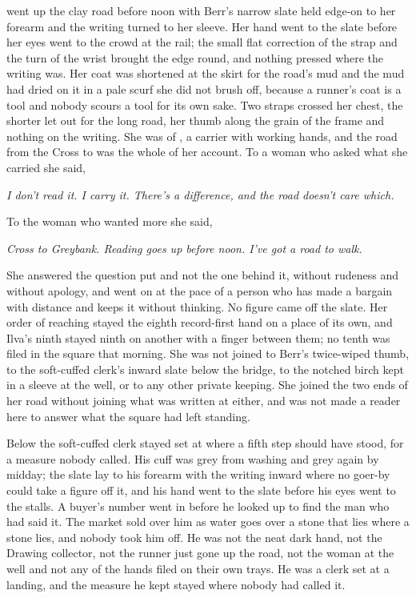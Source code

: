 \scenebreak

 went up the clay road before noon with Berr's narrow slate held edge-on to her forearm and the writing turned to her sleeve. Her hand went to the slate before her eyes went to the crowd at the rail; the small flat correction of the strap and the turn of the wrist brought the edge round, and nothing pressed where the writing was. Her coat was shortened at the skirt for the road's mud and the mud had dried on it in a pale scurf she did not brush off, because a runner's coat is a tool and nobody scours a tool for its own sake. Two straps crossed her chest, the shorter let out for the long road, her thumb along the grain of the frame and nothing on the writing. She was of , a carrier with working hands, and the road from the Cross to  was the whole of her account. To a woman who asked what she carried she said,

\emph{I don't read it. I carry it. There's a difference, and the road doesn't care which.}

To the woman who wanted more she said,

\emph{Cross to Greybank. Reading goes up before noon. I've got a road to walk.}

She answered the question put and not the one behind it, without rudeness and without apology, and went on at the pace of a person who has made a bargain with distance and keeps it without thinking. No figure came off the slate. Her order of reaching stayed the eighth record-first hand on a place of its own, and Ilva's ninth stayed ninth on another with a finger between them; no tenth was filed in the square that morning. She was not joined to Berr's twice-wiped thumb, to the soft-cuffed clerk's inward slate below the bridge, to the notched birch kept in a sleeve at the well, or to any other private keeping. She joined the two ends of her road without joining what was written at either, and was not made a reader here to answer what the square had left standing.

Below  the soft-cuffed clerk stayed set at  where a fifth step should have stood, for a measure nobody called. His cuff was grey from washing and grey again by midday; the slate lay to his forearm with the writing inward where no goer-by could take a figure off it, and his hand went to the slate before his eyes went to the stalls. A buyer's number went in before he looked up to find the man who had said it. The market sold over him as water goes over a stone that lies where a stone lies, and nobody took him off. He was not the neat dark hand, not the Drawing collector, not the runner just gone up the road, not the woman at the well and not any of the hands filed on their own trays. He was a clerk set at a landing, and the measure he kept stayed where nobody had called it.

